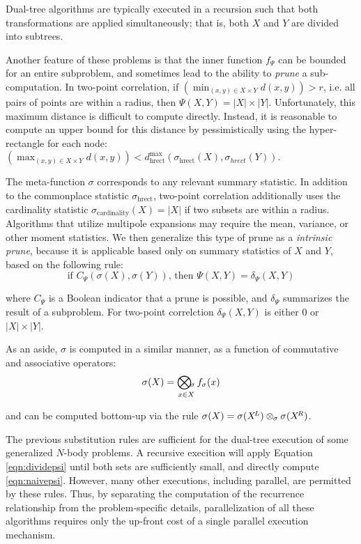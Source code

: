 \documentclass[times, 10pt,twocolumn]{article}
\DeclareMathOperator{\cardinality}{cardinality}
\DeclareMathOperator{\hrect}{hrect}
\newcommand{\kdleft}{\hspace{-0.02in}^L}
\newcommand{\kdright}{\hspace{-0.02in}^R}
\newcommand{\myOp}[1]{\mathop{\bigotimes\nolimits\hspace{-0.045in}_{#1}}}
\newcommand{\myop}[1]{\otimes\hspace{-0.04in}_{#1}\hspace{0.03in}}
\newcommand{\allpsi}{\Psi}
\newcommand{\fpsi}{f_{\Psi}}
\newcommand{\canprunepsi}{C_{\Psi}}
\newcommand{\deltapsi}{\delta_{\Psi}}
\newcommand{\allsigma}{\sigma}
\newcommand{\Opsigma}{\myOp{\sigma}}
\newcommand{\opsigma}{\myop{\sigma}}
\newcommand{\fsigma}{f_{\sigma}}
\begin{document}
Dual-tree algorithms are typically executed in a recursion such that both transformations are applied simultaneously; that is, both $X$ and $Y$ are divided into subtrees.

Another feature of these problems is that the inner function $\fpsi$ can be bounded for an entire subproblem, and sometimes lead to the ability to {\it prune} a sub-computation.
In two-point correlation, if $\left(\min_{(x, y) \in X \times Y} d(x, y)\right) > r$, i.e. all pairs of points are within a radius, then $\allpsi(X, Y) = |X| \times |Y|$.
Unfortunately, this maximum distance is difficult to compute directly.
Instead, it is reasonable to compute an upper bound for this distance by pessimistically using the hyper-rectangle for each node: $\left(\max_{(x, y) \in X \times Y} d(x, y)\right) < d^{\max}_{\hrect}(\allsigma_{\hrect}(X), \allsigma_{hrect}(Y))$.

The meta-function $\allsigma$ corresponds to any relevant summary statistic.
In addition to the commonplace statistic $\allsigma_{\hrect}$, two-point correlation additionally uses the cardinality statistic $\allsigma_{\cardinality}(X) = |X|$ if two subsets are within a radius.
Algorithms that utilize multipole expansions may require the mean, variance, or other moment statistics.
We then generalize this type of prune as a {\it intrinsic prune}, because it is applicable based only on summary statistics of $X$ and $Y$, based on the following rule:
\begin{equation}
\text{if } \canprunepsi(\allsigma(X), \allsigma(Y)) \text{, then } \allpsi(X, Y) = \deltapsi(X, Y)
\label{eqn:intrinsic}
\end{equation}

\noindent where $\canprunepsi$ is a Boolean indicator that a prune is possible, and $\deltapsi$ summarizes the result of a subproblem.
For two-point correlction $\deltapsi(X, Y)$ is either $0$ or $|X| \times |Y|$.

As an aside, $\allsigma$ is computed in a similar manner, as a function of commutative and associative operators:
\begin{equation}
\allsigma(X) = \Opsigma_{x \in X} \fsigma(x)
\label{eqn:defsigma}
\end{equation}

\noindent and can be computed bottom-up via the rule $\allsigma(X) = \allsigma(X\kdleft) \opsigma \allsigma(X\kdright)$.

\noindent The previous substitution rules are sufficient for the dual-tree execution of some generalized $N$-body problems.
A recursive execition will apply Equation \ref{eqn:dividepsi} until both sets are sufficiently small, and directly compute \ref{eqn:naivepsi}.
However, many other executions, including parallel, are permitted by these rules.
Thus, by separating the computation of the recurrence relationship from the problem-specific details, parallelization of all these algorithms requires only the up-front cost of a single parallel execution mechanism.
\end{document}
